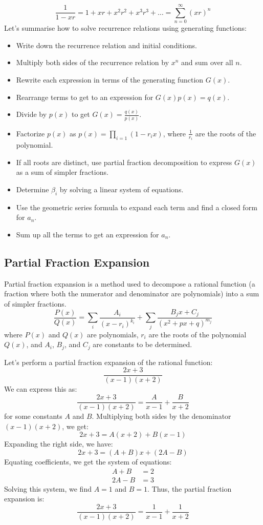 \[ \frac{1}{1 - xr} = 1 + xr + x^2r^2 + x^3r^3 + \ldots = \sum_{n=0}^{\infty} (xr)^n \]
Let's summarise how to solve recurrence relations using generating functions:
\begin{itemize}[itemsep=1pt,label=$\circ$]
    \item Write down the recurrence relation and initial conditions.
    \item Multiply both sides of the recurrence relation by $x^n$ and sum over all $n$.
    \item Rewrite each expression in terms of the generating function $G(x)$.
    \item Rearrange terms to get to an expression for $G(x)p(x) = q(x)$.
    \item Divide by $p(x)$ to get $G(x) = \frac{q(x)}{p(x)}$.
    \item Factorize $p(x)$ as $p(x) = \prod_{i=1} (1 - r_ix)$, where $\frac{1}{r_i}$ are the roots of the polynomial.
    \item If all roots are distinct, use partial fraction decomposition to express $G(x)$ as a sum of simpler fractions.
    \item Determine $\beta_i$ by solving a linear system of equations.
    \item Use the geometric series formula to expand each term and find a closed form for $a_n$.
    \item Sum up all the terms to get an expression for $a_n$.
\end{itemize}

\subsection{Partial Fraction Expansion}
\begin{definition}
    Partial fraction expansion is a method used to decompose a rational function (a fraction where both the numerator and denominator are polynomials) into a sum of simpler fractions.
    \[ \frac{P(x)}{Q(x)} = \sum_{i} \frac{A_i}{(x - r_i)^{k_i}} + \sum_{j} \frac{B_j x + C_j}{(x^2 + px + q)^{m_j}} \]
    where $P(x)$ and $Q(x)$ are polynomials, $r_i$ are the roots of the polynomial $Q(x)$, and $A_i$, $B_j$, and $C_j$ are constants to be determined.
\end{definition}
\begin{eg}
    Let's perform a partial fraction expansion of the rational function:
    \[ \frac{2x + 3}{(x - 1)(x + 2)} \]
    We can express this as:
    \[ \frac{2x + 3}{(x - 1)(x + 2)} = \frac{A}{x - 1} + \frac{B}{x + 2} \]
    for some constants $A$ and $B$. Multiplying both sides by the denominator $(x - 1)(x + 2)$, we get:
    \[ 2x + 3 = A(x + 2) + B(x - 1) \]
    Expanding the right side, we have:
    \[ 2x + 3 = (A + B)x + (2A - B) \]
    Equating coefficients, we get the system of equations:
    \begin{align*}
        A + B &= 2 \\
        2A - B &= 3
    \end{align*}
    Solving this system, we find $A = 1$ and $B = 1$. Thus, the partial fraction expansion is:
    \[ \frac{2x + 3}{(x - 1)(x + 2)} = \frac{1}{x - 1} + \frac{1}{x + 2} \]
\end{eg}

